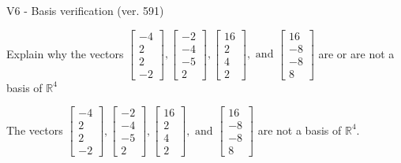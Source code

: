 \begin{exercise}
  \begin{exerciseTitle}V6 - Basis verification (ver. 591)\end{exerciseTitle}
  \begin{exerciseStatement}
    Explain why the vectors \(\left[\begin{array}{r}
-4 \\
2 \\
2 \\
-2
\end{array}\right] , \left[\begin{array}{r}
-2 \\
-4 \\
-5 \\
2
\end{array}\right] , \left[\begin{array}{r}
16 \\
2 \\
4 \\
2
\end{array}\right] , \text{ and } \left[\begin{array}{r}
16 \\
-8 \\
-8 \\
8
\end{array}\right]\) are or are not a basis of \(\mathbb{R}^4\)	


  \end{exerciseStatement}
  \begin{exerciseAnswer}
   The vectors \(\left[\begin{array}{r}
-4 \\
2 \\
2 \\
-2
\end{array}\right] , \left[\begin{array}{r}
-2 \\
-4 \\
-5 \\
2
\end{array}\right] , \left[\begin{array}{r}
16 \\
2 \\
4 \\
2
\end{array}\right] , \text{ and } \left[\begin{array}{r}
16 \\
-8 \\
-8 \\
8
\end{array}\right]\) 
  	 are not  a basis of \(\mathbb{R}^4\).
  


  \end{exerciseAnswer}
\end{exercise}